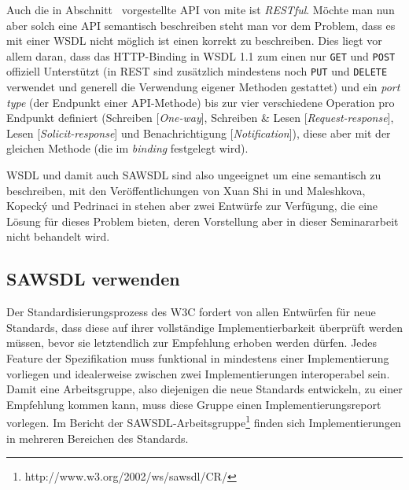 Auch die in Abschnitt~\pageref{l:einleitung} vorgestellte \ac{API} von \ac{mite} ist \emph{RESTful}. Möchte man nun aber solch eine \ac{API} semantisch beschreiben steht man vor dem Problem, dass es mit einer \ac{WSDL} nicht möglich ist einen \restapi korrekt zu beschreiben. Dies liegt vor allem daran, dass das HTTP-Binding in \ac{WSDL} 1.1 zum einen nur \texttt{GET} und \texttt{POST} offiziell Unterstützt (in \ac{REST} sind zusätzlich mindestens noch \texttt{PUT} und \texttt{DELETE} verwendet und generell die Verwendung eigener Methoden gestattet) und ein \emph{port type} (der Endpunkt einer API-Methode) bis zur vier verschiedene Operation pro Endpunkt definiert (Schreiben [\emph{One-way}], Schreiben \& Lesen [\emph{Request-response}], Lesen [\emph{Solicit-response}] und Benachrichtigung [\emph{Notification}]), diese aber mit der gleichen Methode (die im \emph{binding} festgelegt wird).

\ac{WSDL} und damit auch \ac{SAWSDL} sind also ungeeignet um eine \restapi semantisch zu beschreiben, mit den Veröffentlichungen von Xuan Shi in \cite{xn-sss} und Maleshkova, Kopeck\'{y} und Pedrinaci in \cite{ma-sawslrest} stehen aber zwei Entwürfe zur Verfügung, die eine Lösung für dieses Problem bieten, deren Vorstellung aber in dieser Seminararbeit nicht behandelt wird.


\subsection{\acs{SAWSDL} verwenden}

Der Standardisierungsprozess des \ac{W3C} fordert von allen Entwürfen für neue Standards, dass diese auf ihrer vollständige Implementierbarkeit überprüft werden müssen, bevor sie letztendlich zur Empfehlung erhoben werden dürfen. Jedes Feature der Spezifikation muss funktional in mindestens einer Implementierung vorliegen und idealerweise zwischen zwei Implementierungen interoperabel sein. Damit eine Arbeitsgruppe, also diejenigen die neue Standards entwickeln, zu einer Empfehlung kommen kann, muss diese Gruppe einen Implementierungsreport vorlegen. Im Bericht der \ac{SAWSDL}-Arbeitsgruppe\footnote{http://www.w3.org/2002/ws/sawsdl/CR/} finden sich Implementierungen in mehreren Bereichen des Standards.

